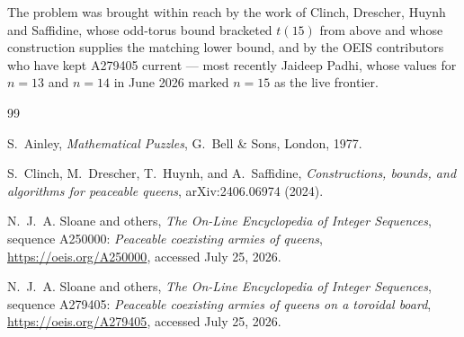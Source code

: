 \documentclass[11pt]{amsart}
\theoremstyle{remark}
\begin{document}
The problem was brought within reach by the work of Clinch, Drescher, Huynh and Saffidine, whose odd-torus bound bracketed $t(15)$ from above and whose construction supplies the matching lower bound, and by the OEIS contributors who have kept A279405 current --- most recently Jaideep Padhi, whose values for $n=13$ and $n=14$ in June 2026 marked $n=15$ as the live frontier.

\begin{thebibliography}{99}

S.~Ainley,
\emph{Mathematical Puzzles},
G.~Bell \& Sons, London, 1977.

S.~Clinch, M.~Drescher, T.~Huynh, and A.~Saffidine,
\emph{Constructions, bounds, and algorithms for peaceable queens},
arXiv:2406.06974 (2024).

N.~J.~A. Sloane and others,
\emph{The On-Line Encyclopedia of Integer Sequences}, sequence A250000:
\emph{Peaceable coexisting armies of queens},
\url{https://oeis.org/A250000}, accessed July 25, 2026.

N.~J.~A. Sloane and others,
\emph{The On-Line Encyclopedia of Integer Sequences}, sequence A279405:
\emph{Peaceable coexisting armies of queens on a toroidal board},
\url{https://oeis.org/A279405}, accessed July 25, 2026.

\end{thebibliography}
\end{document}
